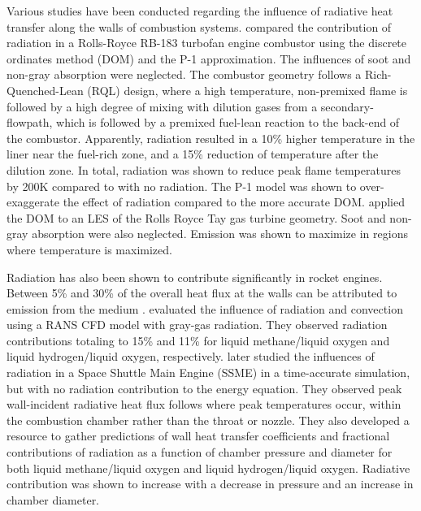 Various studies have been conducted regarding the influence of radiative heat transfer along the walls of combustion systems. \citet{Gamil2020AssessmentChamber} compared the contribution of radiation in a Rolls-Royce RB-183 turbofan engine combustor using the discrete ordinates method (DOM) and the P-1 approximation. The influences of soot and non-gray absorption were neglected.
The combustor geometry follows a Rich-Quenched-Lean (RQL) design, where a high temperature, non-premixed flame is followed by a high degree of mixing with dilution gases from a secondary-flowpath, which is followed by a premixed fuel-lean reaction to the back-end of the combustor.
Apparently, radiation resulted in a 10\% higher temperature in the liner near the fuel-rich zone, and a 15\% reduction of temperature after the dilution zone.
In total, radiation was shown to reduce peak flame temperatures by 200K compared to with no radiation.
The P-1 model was shown to over-exaggerate the effect of radiation compared to the more accurate DOM.
\citet{Paul2006RadiativeCombustor} applied the DOM to an LES of the Rolls Royce Tay gas turbine geometry. Soot and non-gray absorption were also neglected. Emission was shown to maximize in regions where temperature is maximized.

Radiation has also been shown to contribute significantly in rocket engines. Between 5\% and 30\% of the overall heat flux at the walls can be attributed to emission from the medium \cite{Johnson2021AnalysisMethod,Sutton2001RocketElements,Naraghi2005ModelingEngines,Pizzarelli2021OverviewChambers}. \citet{Leccese2018ConvectiveChambers} evaluated the influence of radiation and convection using a RANS CFD model with gray-gas radiation. 
They observed radiation contributions totaling to 15\% and 11\% for liquid methane/liquid oxygen and liquid hydrogen/liquid oxygen, respectively.
\citet{Leccese2019NumericalChambers} later studied the influences of radiation in a Space Shuttle Main Engine (SSME) in a time-accurate simulation, but with no radiation contribution to the energy equation.
They observed peak wall-incident radiative heat flux follows where peak temperatures occur, within the combustion chamber rather than the throat or nozzle. They also developed a resource to gather predictions of wall heat transfer coefficients and fractional contributions of radiation as a function of chamber pressure and diameter for both liquid methane/liquid oxygen and liquid hydrogen/liquid oxygen.
Radiative contribution was shown to increase with a decrease in pressure and an increase in chamber diameter.

